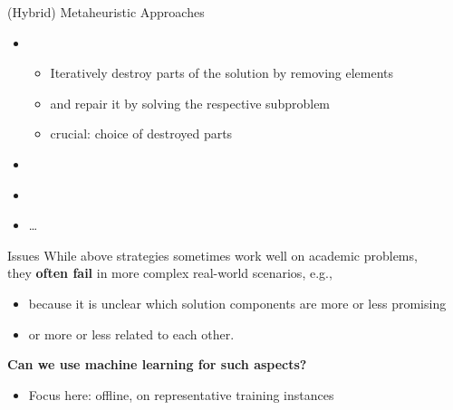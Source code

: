 \documentclass[aspectratio=1610]{beamer}
\newcommand{\important}[1]{{\color{green!60!black}#1}}
\begin{document}
\begin{frame}{(Hybrid) Metaheuristic Approaches}
	\begin{itemize}
		\itemsep5ex
		\item {}\\
		\begin{itemize}
			\item Iteratively \important{destroy} parts of the solution by removing elements
			\item and \important{repair} it by solving the respective subproblem
			\item \alert{crucial:} choice of destroyed parts
		\end{itemize}
		\item {} \citep{blum-16b}
		\item {} \citep{taillard-02}
		\item \ldots
	\end{itemize}
\end{frame}

\begin{frame}{Issues}
	While above strategies sometimes work well on academic problems,\\ they \alert{{\bf often fail} in more complex real-world scenarios}, e.g.,
	
	\bigskip
	\begin{itemize}
		\itemsep2ex
		\item because it is \alert{unclear which solution components are more or less promising}
		\item or \alert{more or less related to each other}. 
	\end{itemize}

	\vspace{1cm}
	\important{\bf Can we use machine learning for such aspects?}
	\begin{itemize}
		\item Focus here: offline, on representative training instances
	\end{itemize}
\end{frame}
\end{document}
